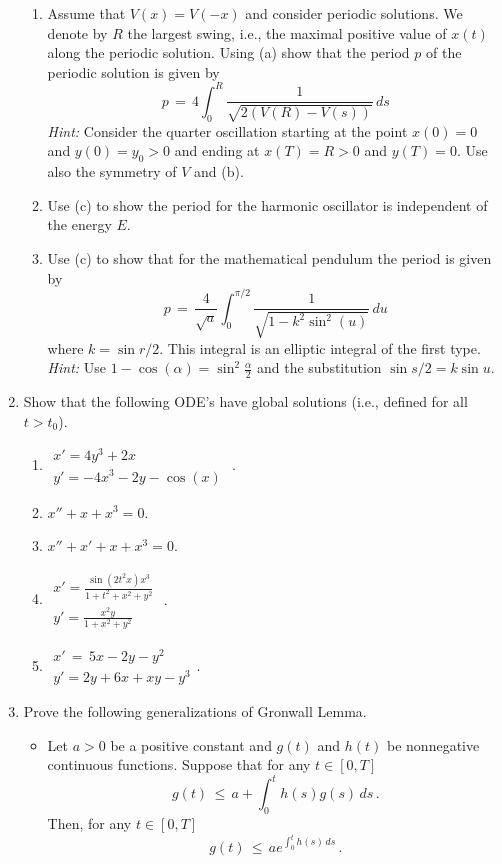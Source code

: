 \documentclass[12pt]{report}
\begin{document}
\begin{enumerate}
\begin{enumerate}
\item Assume that $V(x)=V(-x)$ and consider periodic solutions.  We denote by 
$R$  the largest swing, i.e., the maximal positive value of $x(t)$ along the periodic solution.  
Using (a) show that the period $p$ 
of the periodic solution is given by 
$$
p \,=\, 4 \int_0^R \frac{1}{\sqrt{ 2(V(R) - V(s))}} \, ds
$$
{\em Hint:} Consider the quarter oscillation starting at the point $x(0)=0$ and 
$y(0)=y_0>0$ and ending at $x(T) =R> 0$ and $y(T)=0$.  Use also the symmetry of $V$ and (b). 
\item Use (c) to show the period for the harmonic oscillator is independent of the energy $E$.  
\item Use (c) to show that for the mathematical pendulum the period is given by 
$$
p \,=\, \frac{4}{\sqrt a} \int_0^{\pi/2}  \frac{1} {\sqrt{1 - k^2 \sin^2(u)}} \, du
$$ 
where $k = \sin r/2$.  This integral is an elliptic integral of the first type.  
{\em Hint:} Use $1- \cos(\alpha) = \sin^2 \frac{\alpha}{2}$ and  the substitution $\sin s/2 = k \sin u$. 

\end{enumerate} 
  



\item Show that the following ODE's have global solutions (i.e., defined for all $t>t_0$). 
\begin{enumerate}
\item ${\displaystyle \begin{array}{ll}x' = 4y^3 +2x \\ y' = -4x^3 -2y - \cos(x) \end{array}} $ .
\item $x'' + x + x^3 =0$.
\item $x'' + x' + x + x^3 =0$.
\item ${\displaystyle \begin{array}{ll} x' = \frac{\sin(2t^2 x) x^3}{1+ t^2 + x^2 + y^2} \\ 
y'= \frac{x^2 y}{1 + x^2 + y^2} \end{array}}$  .
\item $\begin{array}{ll} x' \,=\, 5x  - 2y - y^2 \\ y'= 2y +6x +xy -y^3\end{array}$.
\end{enumerate}




\item Prove the following generalizations of Gronwall Lemma. 
\begin{itemize}
\item
Let $a>0$ be a positive constant and $g(t)$ and $h(t)$ be nonnegative continuous functions. 
Suppose that for any $t \in [0,T]$ 
\begin{equation}
g(t) \,\le\, a + \int_{0}^t h(s) g(s) \, ds \,.
\end{equation}
Then, for any $t \in [0,T]$
\begin{equation}
g(t)\,\le\, a e^{\int_0^t h(s)\, ds} \,. 
\end{equation}


\end{itemize}
\end{enumerate}
\end{document}
